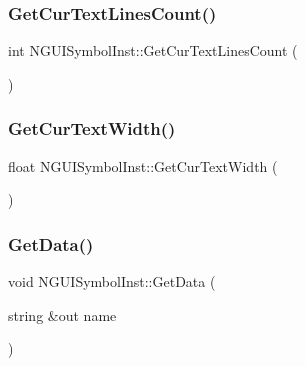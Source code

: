 \hypertarget{class_n_g_u_i_symbol_inst_a42306f44487648c6b89a6aaea58bfd78}{}\label{class_n_g_u_i_symbol_inst_a42306f44487648c6b89a6aaea58bfd78} 
\subsubsection{\texorpdfstring{Get\+Cur\+Text\+Lines\+Count()}{GetCurTextLinesCount()}}
{\footnotesize\ttfamily int N\+G\+U\+I\+Symbol\+Inst\+::\+Get\+Cur\+Text\+Lines\+Count (\begin{DoxyParamCaption}{ }\end{DoxyParamCaption})}

\hypertarget{class_n_g_u_i_symbol_inst_afee9d0c2bd15d84655e826c0ab357493}{}\label{class_n_g_u_i_symbol_inst_afee9d0c2bd15d84655e826c0ab357493} 
\subsubsection{\texorpdfstring{Get\+Cur\+Text\+Width()}{GetCurTextWidth()}}
{\footnotesize\ttfamily float N\+G\+U\+I\+Symbol\+Inst\+::\+Get\+Cur\+Text\+Width (\begin{DoxyParamCaption}{ }\end{DoxyParamCaption})}

\hypertarget{class_n_g_u_i_symbol_inst_aa64815f101c03ccbd84af636149fce5d}{}\label{class_n_g_u_i_symbol_inst_aa64815f101c03ccbd84af636149fce5d} 
\subsubsection{\texorpdfstring{Get\+Data()}{GetData()}}
{\footnotesize\ttfamily void N\+G\+U\+I\+Symbol\+Inst\+::\+Get\+Data (\begin{DoxyParamCaption}\item[{string \&out}]{name }\end{DoxyParamCaption})}

\hypertarget{class_n_g_u_i_symbol_inst_ae6273964b69513989236647dcfda9b17}{}\label{class_n_g_u_i_symbol_inst_ae6273964b69513989236647dcfda9b17} 
